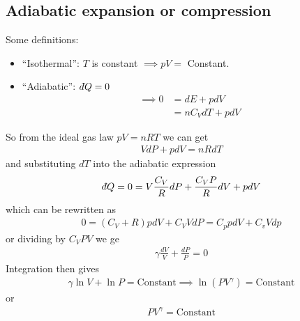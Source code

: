\documentclass[../main.tex]{subfiles}
\begin{document}
\subsection{Adiabatic expansion or compression}

Some definitions:
\begin{itemize}
    \item ``Isothermal'': $T$ is constant $\implies pV =$ Constant.
    \item ``Adiabatic'': $d\hspace*{-0.08em}\bar{}\hspace*{0.1em} Q = 0$ 
    \begin{align*}
        \implies 0 &= dE + pdV \\
        &= n C_V dT + pdV
    \end{align*}
\end{itemize}
So from the ideal gas law $pV = nRT$ we can get
\begin{align*}
    V dP + pdV = nR dT
\end{align*}
and substituting $dT$ into the adiabatic expression
\begin{align*}
    d\hspace*{-0.08em}\bar{}\hspace*{0.1em} Q = 0 = V \frac{C_V}{R} dP + \frac{C_V P}{R} dV + p dV
\end{align*}
which can be rewritten as
\begin{align*}
    0 = (C_V + R) pdV + C_V V dP = C_p pdV + C_v V dp
\end{align*}
or dividing by $C_V PV$ we ge
\begin{align*}
    \gamma \frac{dV}{V} + \frac{dP}{P} = 0
\end{align*} 
Integration then gives
\begin{align*}
    \gamma \ln V + \ln P = \textrm{Constant} \implies \ln (PV^\gamma) = \textrm{Constant}
\end{align*}
or 
\begin{align*}
    PV^\gamma = \textrm{Constant}
\end{align*}
\end{document}
